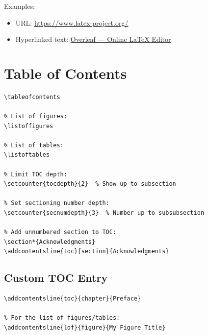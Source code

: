 Examples:
\begin{itemize}
    \item URL: \url{https://www.latex-project.org/}
    \item Hyperlinked text: \href{https://www.overleaf.com/}{Overleaf --- Online LaTeX Editor}
\end{itemize}

\section{Table of Contents}

\begin{lstlisting}[language={[LaTeX]TeX}, caption=Table of contents]
% Basic table of contents:
\tableofcontents

% List of figures:
\listoffigures

% List of tables:
\listoftables

% Limit TOC depth:
\setcounter{tocdepth}{2}  % Show up to subsection

% Set sectioning number depth:
\setcounter{secnumdepth}{3}  % Number up to subsubsection

% Add unnumbered section to TOC:
\section*{Acknowledgments}
\addcontentsline{toc}{section}{Acknowledgments}
\end{lstlisting}

\subsection{Custom TOC Entry}

\begin{lstlisting}[language={[LaTeX]TeX}, caption=Custom TOC entries]
% Add arbitrary entries to TOC:
\addcontentsline{toc}{chapter}{Preface}

% For the list of figures/tables:
\addcontentsline{lof}{figure}{My Figure Title}
\end{lstlisting}
